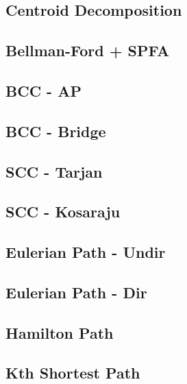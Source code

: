 \documentclass[a4paper,10pt,twocolumn,oneside,x11names]{article}
\begin{document}
\subsection{Centroid Decomposition}


\subsection{Bellman-Ford + SPFA}


\subsection{BCC - AP}


\subsection{BCC - Bridge}


\subsection{SCC - Tarjan}


\subsection{SCC - Kosaraju}


\subsection{Eulerian Path - Undir}


\subsection{Eulerian Path - Dir}


\subsection{Hamilton Path}


\subsection{Kth Shortest Path}

\end{document}
